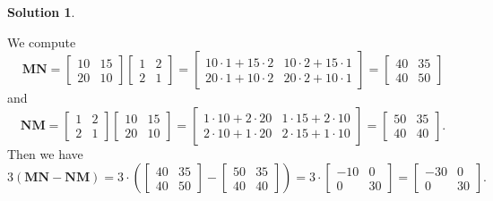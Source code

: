 \documentclass[12pt]{report} %
\theoremstyle{definition}
\newtheorem{solution}{Solution}
\begin{document}
\begin{solution}
\begin{enumerate}[(a)]
    We compute
    \[
    \mathbf{MN}=\begin{bmatrix} 10 & 15 \\ 20 & 10\end{bmatrix} \begin{bmatrix} 1 & 2\\ 2&1\end{bmatrix} =
    \begin{bmatrix} 10\cdot 1+15\cdot 2 & 10\cdot 2 + 15\cdot 1\\ 20\cdot 1 + 10\cdot 2 & 20\cdot 2 + 10\cdot 1\end{bmatrix} =\begin{bmatrix} 40 & 35\\ 40 & 50\end{bmatrix}
    \]
    and
    \[
    \mathbf{NM}=\begin{bmatrix} 1 & 2\\ 2 & 1\end{bmatrix} \begin{bmatrix} 10 & 15\\ 20 & 10\end{bmatrix} = \begin{bmatrix} 1\cdot 10 + 2\cdot 20 & 1 \cdot 15 + 2\cdot 10\\ 2\cdot 10 + 1\cdot 20 & 2\cdot 15 + 1\cdot 10\end{bmatrix} =\begin{bmatrix}50 & 35\\ 40 & 40 \end{bmatrix}.
    \]
    Then we have
    \[
    3(\mathbf{MN}-\mathbf{NM})=3\cdot \left( \begin{bmatrix} 40 & 35 \\ 40 & 50 \end{bmatrix} - \begin{bmatrix} 50 & 35 \\ 40 & 40 \end{bmatrix}\right) = 3\cdot \begin{bmatrix} -10 & 0\\ 0 & 30 \end{bmatrix} = \begin{bmatrix} -30 & 0 \\ 0 & 30 \end{bmatrix}.
    \]
\end{enumerate}
\end{solution}
\end{document}
